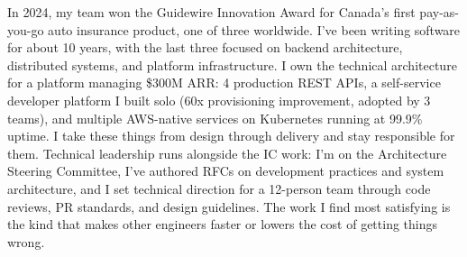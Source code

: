 \begin{cvparagraph}
    In 2024, my team won the Guidewire Innovation Award for Canada's first pay-as-you-go auto insurance product, one of three worldwide. I've been writing software for about 10 years, with the last three focused on backend architecture, distributed systems, and platform infrastructure. I own the technical architecture for a platform managing \$300M ARR: 4 production REST APIs, a self-service developer platform I built solo (60x provisioning improvement, adopted by 3 teams), and multiple AWS-native services on Kubernetes running at 99.9\% uptime. I take these things from design through delivery and stay responsible for them. Technical leadership runs alongside the IC work: I'm on the Architecture Steering Committee, I've authored RFCs on development practices and system architecture, and I set technical direction for a 12-person team through code reviews, PR standards, and design guidelines. The work I find most satisfying is the kind that makes other engineers faster or lowers the cost of getting things wrong.
\end{cvparagraph}
